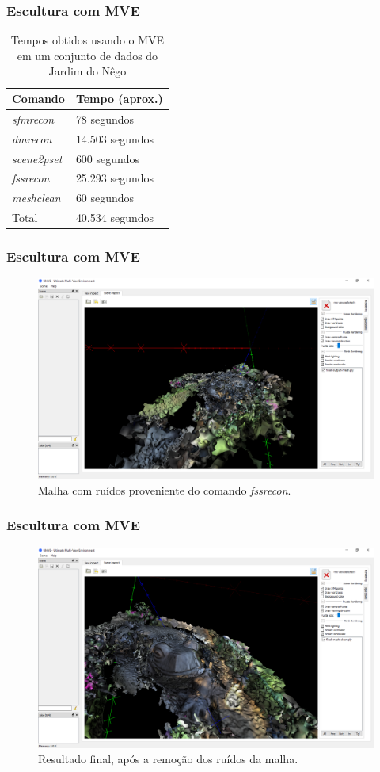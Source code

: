 \documentclass[table, usenames, svgnames, xcolor=dvipsnames]{beamer}
\begin{document}
\begin{frame}
\frametitle{\textbf{Escultura com MVE}}
	\begin{table}[!h]
	\centering
	\caption{Tempos obtidos usando o MVE em um conjunto de dados do Jardim do Nêgo}
	\label{tab:mveSapo}
		\begin{tabular}{|l|l|}
			\hline
			Comando            & Tempo (aprox.)    \\ \hline
			\protect\emph{sfmrecon}  & 78 segundos     \\ \hline
			\protect\emph{dmrecon}   & 14.503 segundos \\ \hline
			\protect\emph{scene2pset} & 600 segundos    \\ \hline
			\protect\emph{fssrecon}  & 25.293 segundos \\ \hline
			\protect\emph{meshclean} & 60 segundos     \\ \hline
			Total & 40.534 segundos\\ \hline
		\end{tabular}
	\end{table}
\end{frame}

\begin{frame}
\frametitle{\textbf{Escultura com MVE}}
	\begin{figure}[!h]
		\centering
		\includegraphics[width=0.8\linewidth]{figs/mvemeshout.png}
		\caption{%
		Malha com ruídos proveniente do comando \protect\emph{fssrecon}.
		}\label{fig:MVEFSSRMesh}
	\end{figure} 
\end{frame}

\begin{frame}
\frametitle{\textbf{Escultura com MVE}}
	\begin{figure}[!h]
		\centering
		\includegraphics[width=0.8\linewidth]{figs/mvemeshclean.png}
		\caption{%
		Resultado final, após a remoção dos ruídos da malha.
		}\label{fig:MVEMeshClean}
	\end{figure} 
\end{frame}
\end{document}

